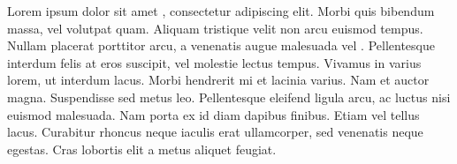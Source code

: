 Lorem ipsum dolor sit amet \cite{bibtex2021}, consectetur adipiscing elit. Morbi quis bibendum massa, vel volutpat quam. Aliquam tristique velit non arcu euismod tempus. Nullam placerat porttitor arcu, a venenatis augue malesuada vel \cite{mueller2023}. Pellentesque interdum felis at eros suscipit, vel molestie lectus tempus. Vivamus in varius lorem, ut interdum lacus. Morbi hendrerit mi et lacinia varius. Nam et auctor magna. Suspendisse sed metus leo. Pellentesque eleifend ligula arcu, ac luctus nisi euismod malesuada. Nam porta ex id diam dapibus finibus. Etiam vel tellus lacus. Curabitur rhoncus neque iaculis erat ullamcorper, sed venenatis neque egestas. Cras lobortis elit a metus aliquet feugiat.
